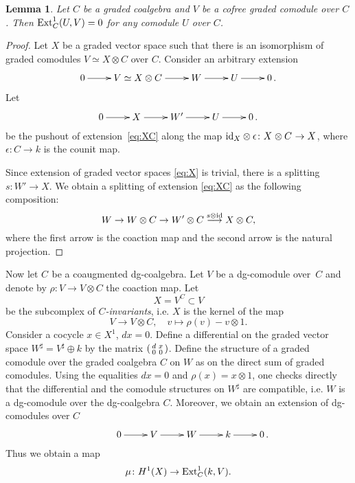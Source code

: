\documentclass[10pt,russian]{article}
\theoremstyle{plain}
\newtheorem{lemma}[theorem]{Lemma}
\theoremstyle{definition}
\newcommand{\id}{{\rm id}}
\newcommand{\Ext}{{\rm Ext}}
\begin{document}
 \begin{lemma}
 	\label{'podlemma'}
 	Let $C$ be a graded coalgebra and $V$ be a cofree graded comodule over $C$. Then $\Ext^1_{C}(U, V) = 0$ for any comodule $U$ over $C$.
 \end{lemma}
 \begin{proof}
 Let $X$ be a graded vector space such that there is an isomorphism of graded comodules ${V\simeq X\otimes C}$ over $C$. Consider an arbitrary extension
 	\begin{equation}
 		\label{eq:XC}
 	\xymatrix{
 		 0 \ar[r] &  V\simeq X \otimes C^{}  \ar[r] & W^{}  \ar[r]  &  U \ar[r] & 0\,.
 	}
 	\end{equation}
 	Let
 	\begin{equation}
 	\label{eq:X}
 	\xymatrix{
 		0 \ar[r] &  X^{}  \ar[r] & W'  \ar[r]  &  U \ar[r] & 0\,.
 	}
 \end{equation}
 	be the pushout of extension~\eqref{eq:XC} along the map
 	$\id_X \otimes \epsilon \colon X^{} \otimes C^{} \to X^{}$, where $\epsilon \colon C \to k$ is the counit map.

 	Since extension of graded vector spaces \eqref{eq:X} is trivial, there is a splitting ${s\colon W' \to X}$. We obtain a splitting of extension \eqref{eq:XC} as the following composition:
 	$$
 	W \to W \otimes C \to W' \otimes C \stackrel{s\otimes\id}\longrightarrow X \otimes C,
 	$$
 	where the first arrow is the coaction map and the second arrow is the natural projection.
 \end{proof}
\medspace
Now let $C^{}$	be a coaugmented dg-coalgebra. Let $V$ be a dg-comodule over~$C$ and denote by $\rho \colon V \to V \otimes C$ the coaction map. Let
$$
X = V^{C} \subset V
$$
be the subcomplex of \emph{$C$-invariants}, i.e. $X$ is the kernel of the map
$$
V \to V \otimes C, \quad v \mapsto \rho (v) - v \otimes 1.
$$
Consider a cocycle $x \in X^1$, $dx=0$. Define a differential on the graded vector space ${W^{\sharp}=V^{\sharp} \oplus k}$ by the matrix $
\begin{psmallmatrix}
d & x \\
	0 & 0 \\
\end{psmallmatrix}
$.
Define the structure of a graded comodule over the graded coalgebra $C$ on $W$ as on the direct sum of graded comodules. Using the equalities $dx=0$ and ${\rho(x)=x\otimes 1}$, one checks directly that the differential and the comodule structures on $W^{\sharp}$ are compatible, i.e. $W$ is a dg-comodule over the dg-coalgebra $C$. Moreover, we obtain an extension of dg-comodules over $C$
$$
	\xymatrix{
	& 0 \ar[r]&  V  \ar[r] & W  \ar[r]  &  k  \ar[r] & 0\,.
}
$$
Thus we obtain a map
\begin{equation}\label{eq:lambda}
\mu \colon H^1(X) \to \Ext^1_C(k, V).
\end{equation}
\end{document}
